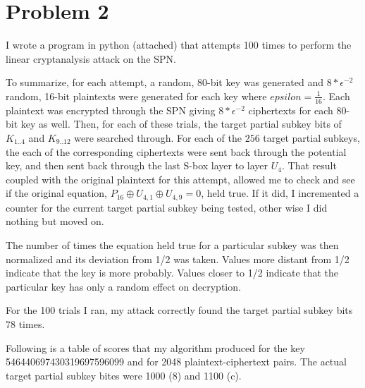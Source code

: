 \documentclass{elsart}
\begin{document}
\newpage
\section{Problem 2}
I wrote a program in python (attached) that attempts 100 times 
to perform the linear cryptanalysis attack on the SPN.

To summarize, for each attempt, a random, 80-bit key was generated and
$8 * \epsilon^{-2}$ random, 16-bit plaintexts were generated for each 
key where $epsilon=\frac{1}{16}$.  Each plaintext was encrypted through
the SPN giving $8 * \epsilon^{-2}$ ciphertexts for each 80-bit key as well.
Then, for each of these trials, the target partial subkey bits of
$K_{1..4}$ and $K_{9..12}$ were searched through.  For each of the $256$ target partial subkeys, the each of the corresponding ciphertexts were sent back
through the potential key, and then sent back through the last S-box layer 
to layer $U_{4}$.
That result coupled with the original plaintext for this attempt, allowed me
to check and see if the original equation, $P_{16} \oplus U_{4,1} \oplus
U_{4,9} = 0$, held true.  If it did, I incremented a counter for the current
target partial subkey being tested, other wise I did nothing but moved on.

The number of times the equation held true for a particular subkey was then 
normalized and its deviation from 1/2 was taken.  Values more distant from 1/2
indicate that the key is more probably.  Values closer to 1/2 indicate that
the particular key has only a random effect on decryption.

For the 100 trials I ran, my attack correctly found the target partial subkey
bits 78 times.

Following is a table of scores that my algorithm produced for the key 546440697430319697596099 and for 2048 plaintext-ciphertext pairs.  The actual target
partial subkey bites were 1000 (8) and 1100 (c).
\end{document}
